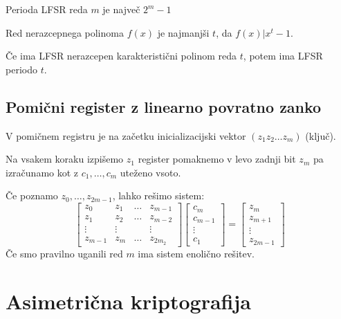 \begin{multicols}{5}
Perioda LFSR reda $m$ je največ $2^m - 1$

Red nerazcepnega polinoma $f(x)$ je najmanjši $t$, da $f(x) | x^t - 1$.

Če ima LFSR nerazcepen karakteristični polinom reda $t$, potem ima LFSR periodo $t$.

\subsection*{Pomični register z linearno povratno zanko}
V pomičnem registru je na začetku inicializacijski vektor $(z_1 z_2 \dots z_m)$ (ključ).

\begin{center}
\end{center}

Na vsakem koraku izpišemo $z_1$ register pomaknemo v levo zadnji bit $z_m$ pa 
izračunamo kot z $c_1, \dots, c_m$ uteženo vsoto.

Če poznamo $z_0, \dots, z_{2m-1}$, lahko rešimo sistem:
\[
\begin{bmatrix}
	z_0 & z_1 & \dots & z_{m-1} \\
	z_1 & z_2 & \dots & z_{m-2} \\
	\vdots & \vdots & & \vdots \\
	z_{m-1} & z_{m} & \dots & z_{2m_2} 
\end{bmatrix}
\begin{bmatrix}
	c_m \\
	c_{m-1} \\
	\vdots \\
	c_1
\end{bmatrix}
=
\begin{bmatrix}
	z_m \\
	z_{m+1} \\
	\vdots \\
	z_{2m-1}
\end{bmatrix}
\]
Če smo pravilno uganili red $m$ ima sistem enolično rešitev.

\section*{Asimetrična kriptografija}

\end{multicols}
